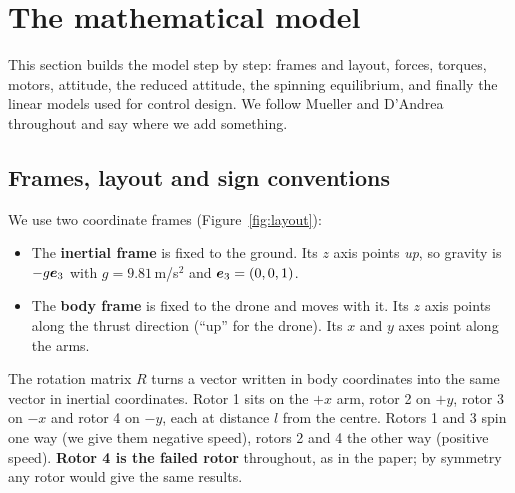 \section{The mathematical model}\label{sec:model}
This section builds the model step by step: frames and layout, forces, torques, motors, attitude, the reduced attitude, the spinning equilibrium, and finally the linear models used for control design. We follow Mueller and D'Andrea~\cite{mueller2014stability} throughout and say where we add something.

\subsection{Frames, layout and sign conventions}
We use two coordinate frames (Figure~\ref{fig:layout}):
\begin{itemize}
  \item The \textbf{inertial frame} is fixed to the ground. Its $z$ axis points \emph{up}, so gravity is $-g\boldsymbol{e}_3$ with $g=9.81$\,m/s$^2$ and $\boldsymbol{e}_3=(0,0,1)$.
  \item The \textbf{body frame} is fixed to the drone and moves with it. Its $z$ axis points along the thrust direction (``up'' for the drone). Its $x$ and $y$ axes point along the arms.
\end{itemize}
The rotation matrix $R$ turns a vector written in body coordinates into the same vector in inertial coordinates. Rotor 1 sits on the $+x$ arm, rotor 2 on $+y$, rotor 3 on $-x$ and rotor 4 on $-y$, each at distance $l$ from the centre. Rotors 1 and 3 spin one way (we give them negative speed), rotors 2 and 4 the other way (positive speed). \textbf{Rotor 4 is the failed rotor} throughout, as in the paper; by symmetry any rotor would give the same results.

